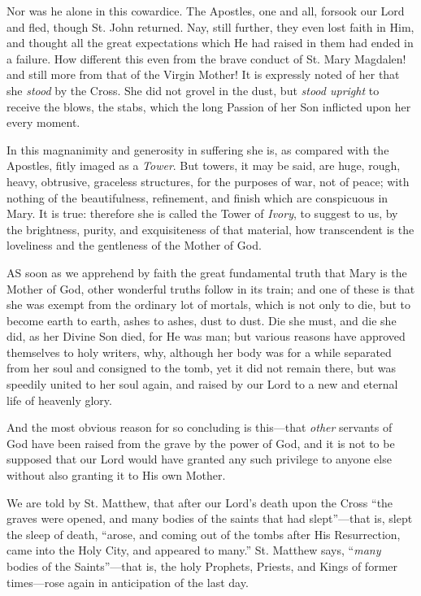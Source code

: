 Nor was he alone in this
cowardice. The Apostles, one and all, forsook our Lord and fled,
though St. John returned. Nay, still further, they even lost faith in
Him, and thought all the great expectations which He had raised in them
had ended in a failure. How different this even from the brave conduct
of St. Mary Magdalen! and still more from that of the Virgin Mother! It
is expressly noted of her that she \emph{stood} by the Cross. She did
not grovel in the dust, but \emph{stood upright} to receive the blows,
the stabs, which the long Passion of her Son inflicted upon her every
moment.

In this magnanimity and
generosity in suffering she is, as compared with the Apostles, fitly
imaged as a \emph{Tower}. But towers, it may be said, are huge, rough,
heavy, obtrusive, graceless structures, for the purposes of war, not of
peace; with nothing of the beautifulness, refinement, and finish which
are conspicuous in Mary. It is true: therefore she is called the Tower
of \emph{Ivory}, to suggest to us, by the brightness, purity, and
exquisiteness of that material, how transcendent is the loveliness and
the gentleness of the Mother of God.




AS
soon as we apprehend by faith the great fundamental truth that Mary is
the Mother of God, other wonderful truths follow in its train; and one
of these is that she was exempt from the ordinary lot of mortals, which
is not only to die, but to become earth to earth, ashes to ashes, dust
to dust. Die she must, and die she did, as her Divine Son died, for He
was man; but various reasons have approved themselves to holy writers,
why, although her body was for a while separated from her soul and
consigned to the tomb, yet it did not remain there, but was speedily
united to her soul again, and raised by our Lord to a new and eternal
life of heavenly glory.

And the most obvious reason for
so concluding is this—that \emph{other} servants of God have been
raised from the grave by the power of God, and it is not to be
supposed that our Lord would have granted any such privilege to anyone
else without also granting it to His own Mother.

We are told by St. Matthew, that
after our Lord's death upon the Cross ``the graves were opened, and many
bodies of the saints that had slept''—that is, slept the sleep of
death, ``arose, and coming out of the tombs after His Resurrection, came
into the Holy City, and appeared to many.'' St. Matthew says, ``\emph{many}
bodies of the Saints''—that is, the holy Prophets, Priests, and Kings
of former times—rose again in anticipation of the last day.

